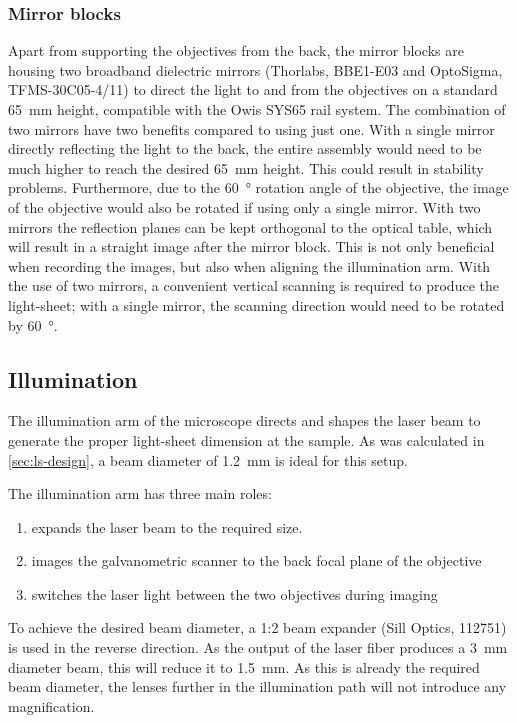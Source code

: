     \subsubsection{Mirror blocks}
    \label{sec:mirrors}
    Apart from supporting the objectives from the back, the mirror blocks are housing two broadband dielectric mirrors (Thorlabs, BBE1-E03 and OptoSigma, TFMS-30C05-4/11) to direct the light to and from the objectives on a standard \SI{65}{mm} height, compatible with the Owis SYS65 rail system. The combination of two mirrors have two benefits compared to using just one. With a single mirror directly reflecting the light to the back, the entire assembly would need to be much higher to reach the desired \SI{65}{mm} height. This could result in stability problems. Furthermore, due to the \SI{60}{\degree} rotation angle of the objective, the image of the objective would also be rotated if using only a single mirror. With two mirrors the reflection planes can be kept orthogonal to the optical table, which will result in a straight image after the mirror block. This is not only beneficial when recording the images, but also when aligning the illumination arm. With the use of two mirrors, a convenient vertical scanning is required to produce the light-sheet; with a single mirror, the scanning direction would need to be rotated by \SI{60}{\degree}.


  
    \subsection{Illumination}

    The illumination arm of the microscope directs and shapes the laser beam to generate the proper light-sheet dimension at the sample. As was calculated in \autoref{sec:ls-design}, a beam diameter of \SI{1.2}{mm} is ideal for this setup.

    The illumination arm has three main roles:
    \begin{enumerate}
      \item expands the laser beam to the required size.
      \item images the galvanometric scanner to the back focal plane of the objective
      \item switches the laser light between the two objectives during imaging
    \end{enumerate}

    To achieve the desired beam diameter, a 1:2 beam expander (Sill Optics, 112751) is used in the reverse direction. As the output of the laser fiber produces a \SI{3}{mm} diameter beam, this will reduce it to \SI{1.5}{mm}. As this is already the required beam diameter, the lenses further in the illumination path will not introduce any magnification.
    
